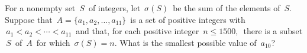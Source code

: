 For a nonempty set $\, S \,$ of integers, let $\, \sigma(S) \,$ be the sum of the elements of $\, S$.  Suppose that $\, A = \{a_1, a_2, \ldots, a_{11} \} \,$ is a set of positive integers with $\, a_1 < a_2 < \cdots < a_{11} \,$ and that, for each positive integer $\, n\leq 1500, \,$ there is a subset  $\, S \,$ of $\, A \,$ for which $\, \sigma(S) = n$.  What is the smallest possible value of $\, a_{10}$?